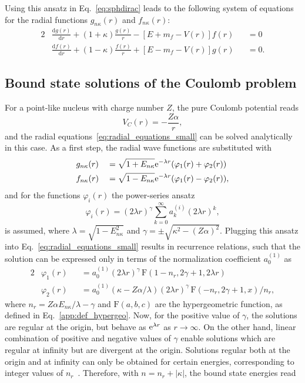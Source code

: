 Using this ansatz in Eq.~\eqref{eq:sphdirac} leads to the following system of equations for the radial functions $g_{n\kappa}(r)$ and $f_{n\kappa}(r)$:
\begin{alignat}{2}
& \frac{\mathrm{d}g(r)}{\mathrm{d}r}+(1+\kappa)\frac{g(r)}{r}
-\left[ E+m_f-V(r) \right] f(r) &&= 0\\[7.5pt]
&\frac{\mathrm{d}f(r)}{\mathrm{d}r}+(1-\kappa)\frac{f(r)}{r}
+\left[ E-m_f-V(r) \right] g(r) &&= 0.
\label{eq:radial_equations_small}
\end{alignat}

\subsection{Bound state solutions of the Coulomb problem}
For a point-like nucleus with charge number $Z$, the pure Coulomb potential reads
\begin{equation}
\label{eq:pureCoulomb}
V_C(r)=-\frac{Z\alpha}{r},
\end{equation}
and the radial equations~\eqref{eq:radial_equations_small} can be solved analytically in this case. As a first step, the radial wave functions are substituted with
\begin{alignat}{2}
&g_{n\kappa}(r)&&= \sqrt{1+E_{n\kappa}}\text{e}^{-\lambda r}(\varphi_1(r)+\varphi_2(r)) \\
&f_{n\kappa}(r)&&=\sqrt{1-E_{n\kappa}}\text{e}^{-\lambda r}(\varphi_1(r)-\varphi_2(r)),
\end{alignat}
and for the functions $\varphi_i(r)$ the power-series ansatz
\begin{equation}
\varphi_i(r)=(2\lambda r)^\gamma \sum_{k=0}^\infty a^{(i)}_k (2\lambda r)^k,
\end{equation}
is assumed, where $\lambda = \sqrt{1-E^2_{n\kappa}}$ and $\gamma=\pm \sqrt{\kappa^2 - (Z\alpha)^2}$. Plugging this ansatz into Eq.~\eqref{eq:radial_equations_small} results in recurrence relations, such that the solution can be expressed only in terms of the normalization coefficient $a^{(1)}_0$ as
\begin{alignat}{2}
& \varphi_1(r)&&=a^{(1)}_0 (2\lambda r)^\gamma\, \text{F}(1-n_r,2\gamma+1,2\lambda r)\\
& \varphi_2(r) &&= a^{(1)}_0 (\kappa -Z\alpha / \lambda) (2\lambda r)^\gamma\, \text{F}(-n_r,2\gamma+1,x) /n_r,
\end{alignat}
where $n_r=Z\alpha E_{n\kappa}/\lambda - \gamma$ and $\text{F}(a,b,c)$ are the hypergeometric function, as defined in Eq.~\eqref{app:def_hypergeo}. Now, for the positive value of $\gamma$, the solutions are regular at the origin, but behave as $\text{e}^{\lambda r}$ as $r\rightarrow \infty$. On the other hand, linear combination of positive and negative values of $\gamma$ enable solutions which are regular at infinity but are divergent at the origin. Solutions regular both at the origin and at infinity can only be obtained for certain energies, corresponding to integer values of $n_r$~\cite{rose1961}. Therefore, with $n=n_r+|\kappa|$, the bound state energies read
